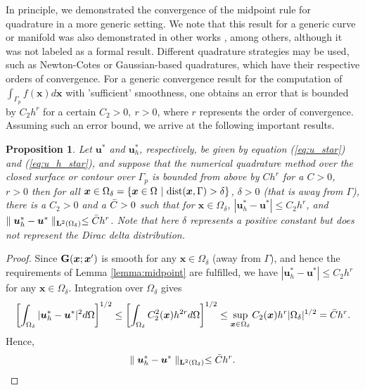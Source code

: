 \documentclass[pdflatex,sn-mathphys-num]{sn-jnl}
\newtheorem{proposition}{Proposition}%
\newtheorem*{lemma star}{Lemma}
\begin{document}
In principle, we demonstrated the convergence of the midpoint rule for quadrature in a more generic setting. We note that this result for a generic curve or manifold was also demonstrated in other works \citep{Peng_2022}, among others, although it was not labeled as a formal result. Different quadrature strategies may be used, such as Newton-Cotes or Gaussian-based quadratures, which have their respective orders of convergence. For a generic convergence result for the computation of $\int_{\Gamma_p} f(\mathbf{x}) d \mathbf{x}$ with 'sufficient' smoothness, one obtains an error that is bounded by $C_2 h^r$ for a certain $C_2 > 0,~ r > 0$, where $r$ represents the order of convergence. Assuming such an error bound, we arrive at the following important results. 
\begin{proposition}
\label{corr1}
    Let $\boldsymbol{u}^{\ast }$ and $\boldsymbol{u}_{h}^{\ast }$, respectively, be given by equation (\ref{eq:u_star}) and (\ref{eq:u_h_star}), and suppose that the numerical quadrature method over the closed surface or contour over $\Gamma_p$ is bounded from above by $C h^r$ for a $C > 0$, $r > 0$ then for all $\boldsymbol{x} \in \Omega_\delta=\{\boldsymbol{x} \in \Omega \ {|} \ {\rm dist} (\boldsymbol{x},\Gamma) >\delta\}$, $\delta > 0$ (that is away from $\Gamma$), there is a $C_2 > 0$ and a $\Bar{C} > 0$ such that for $\boldsymbol{x} \in \Omega_\delta$, 
$|{\boldsymbol u}_h^* - {\boldsymbol u}^*| \le C_2 h^{r}$, and   $\parallel \boldsymbol{u}_{h}^*-\boldsymbol{u}^*\parallel_{{\bf L}^2(\Omega_{\delta})} \leq \Bar{C}h^{r}$. Note that here $\delta$ represents a positive constant but does not represent the Dirac delta distribution.
\end{proposition}
\begin{proof}
    Since ${\bf G}(\boldsymbol{x};\boldsymbol{x}')$ is smooth for any $\boldsymbol{x} \in \Omega_\delta$ (away from $\Gamma$), and hence the requirements of Lemma \ref{lemma:midpoint} are fulfilled, we have $|{\boldsymbol u}_h^* - {\boldsymbol u}^*| \le C_2 h^{r}$ for any $\boldsymbol{x} \in \Omega_\delta$. Integration over $\Omega_\delta$ gives
\begin{equation*}
\begin{split}  
 \left[\int_{\Omega_\delta}| \boldsymbol{u}_{h}^*-\boldsymbol{u}^*|^{2} d{\Omega}\right]^{1/2}\leq \left[\int_{\Omega_\delta}C_2^{2}({\boldsymbol{x}})h^{2r} d{\Omega}\right]^{1/2} \le \sup_{\boldsymbol{x} \in \Omega_\delta} C_2({\boldsymbol{x}})h^{r} |{\Omega_\delta}|^{1/2}= \Bar{C}h^{r}.
\end{split}
\end{equation*}
Hence,
\begin{equation}
\parallel \boldsymbol{u}_{h}^*-\boldsymbol{u}^*\parallel _{{\bf L}^{2}(\Omega_\delta
)}\leq \Bar{C}h^{r}.
\label{one}
\end{equation}
\end{proof}
\end{document}
